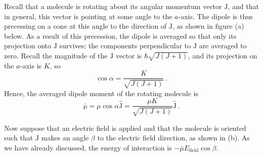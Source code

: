 \documentclass{article}
\theoremstyle{plain}\theoremheaderfont{\normalfont\itshape}\theorembodyfont{\rmfamily}\theoremseparator{.}\newtheorem*{rem}{Remark}\newtheorem*{ex}{Example}\newtheorem*{proof}{Proof}\newtheorem*{altp}{Alternative proof}
\theoremstyle{plain}\theoremheaderfont{\normalfont\bfseries}\theorembodyfont{\rmfamily}\theoremseparator{.}\newtheorem{thm}{Theorem}[section]\newtheorem{lem}[thm]{Lemma}\newtheorem{prop}[thm]{Proposition}\newtheorem*{cor}{Corollary}\newtheorem{defn}[thm]{Definition}\newtheorem{clm}[thm]{Claim}\newtheorem{clminproof}{Claim}\newtheorem{pos}{Postulate}[section]
\theoremstyle{break}\theoremheaderfont{\normalfont\itshape}\theorembodyfont{\rmfamily}\theoremseparator{.\medskip}\newtheorem*{proofskip}{Proof}\newtheorem*{exs}{Examples}\newtheorem*{rems}{Remarks}
\theoremstyle{break}\theoremheaderfont{\normalfont\bfseries}\theorembodyfont{\rmfamily}\theoremseparator{.\medskip}\newtheorem{lemskip}[thm]{Lemma}\newtheorem{defnskip}[thm]{Definition}\newtheorem{propskip}[thm]{Proposition}\newtheorem{thmskip}[thm]{Theorem}
\numberwithin{equation}{section}
\newcommand{\vb}[1]{\bm{\mathrm{#1}}}
\newcommand{\vu}[1]{\hat{\bm{\mathrm{#1}}}}
\newcommand{\symmtop}{\tikz{\draw[fill=white] (-0.8,0.75) circle (0.3);
\draw[thick] (0,1)--(-0.6,0.8);
\draw[thick] (0,1)--(0,2.5);
\draw[thick] (0,1)--(0.95,0.68);
\draw[fill=gray!30] (0,2.2) circle (0.3);
\draw[thick] (0,1)--(-0.3,0.2);
\draw[fill=white] (-0.3,0.2) circle (0.3);
\draw[fill=white] (1.15,0.65) circle (0.3);}}
\begin{document}
    \begin{figure}[ht!]
        \centering
    \end{figure}

    Recall that a molecule is rotating about its angular momentum vector \(\vb{J}\), and that in general, this vector is pointing at some angle to the \(a\)-axis. The dipole is thus precessing on a cone at this angle to the direction of \(\vb{J}\), as shown in figure (a) below. As a result of this precession, the dipole is averaged so that only its projection onto \(\vb{J}\) survives; the components perpendicular to \(\vb{J}\) are averaged to zero. Recall the magnitude of the \(\vb{J}\) vector is \(\hbar\sqrt{J(J+1)}\), and its projection on the \(a\)-axis is \(K\), so
    \begin{equation}
        \cos\alpha=\frac{K}{\sqrt{J(J+1)}}\,.
    \end{equation}
    Hence, the averaged dipole moment of the rotating molecule is
    \begin{equation}
        \bar{\vb{\mu}}=\mu\cos\alpha\vu{J}=\frac{\mu K}{\sqrt{J(J+1)}}\vu{\vb{J}}\,.
    \end{equation}

    Now suppose that an electric field is applied and that the molecule is oriented such that \(\vb{J}\) makes an angle \(\beta\) to the electric field direction, as shown in (b). As we have already discussed, the energy of interaction is \(-\bar{\mu}E_{\text{field}}\cos\beta\).
\end{document}
